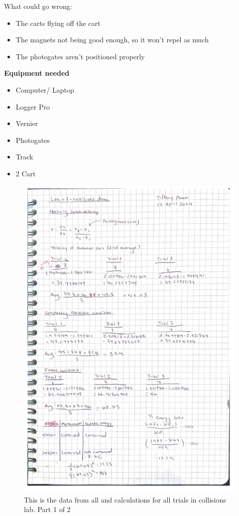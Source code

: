 \documentclass[idxtotoc,hyperref,openany]{labbook} %
\begin{document}
\hfill \break
What could go wrong:
\begin{itemize}
    \item The carts flying off the cart
    \item The magnets not being good enough, so it won't repel as much
    \item The photogates aren't positioned properly
\end{itemize}

\hfill \break
\textbf{Equipment needed}
\begin{itemize}
    \item Computer/ Laptop
    \item Logger Pro
    \item Vernier
    \item Photogates
    \item Track
    \item 2 Cart
\end{itemize}


\newpage
{}
\begin{figure}[H] %
\begin{center}
\includegraphics[width=0.8\linewidth]{images/Lab.07/Lab07Calc1.png}
\end{center}
\caption{This is the data from all and calculations for all trials in collisions lab. Part 1 of 2}
\label{fig:Lab07Calc1}
\end{figure}
\end{document}
